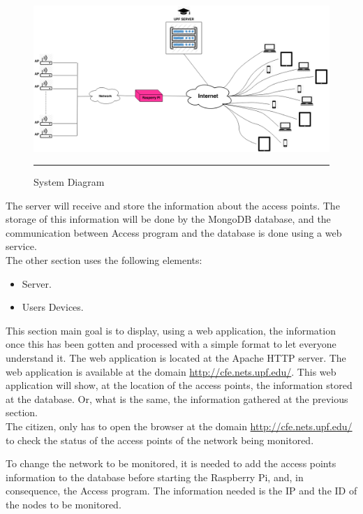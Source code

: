 \documentclass[12pt, a4paper,twoside]{tesi_upf}
\begin{document}
        \begin{figure}[htbp]
          \centering
              \includegraphics[scale=0.42,angle=90]{./figures/arq.png}
              \rule{32em}{0.5pt}
            \caption[System Diagram]{System Diagram}
            \label{fig:arq}
        \end{figure}
        
        The server will receive and store the information about the access points. The storage of this information will be done by the MongoDB database, and the communication between Access program and the database is done using a web service.\\
        
        The other section uses the following elements:
          \begin{itemize}
            \item Server.
            \item Users Devices.
        \end{itemize}
        
        This section main goal is to display, using a web application, the information once this has been gotten and processed with a simple format to let everyone understand it. The web application is located at the Apache HTTP server. The web application is available at the domain \url{http://cfe.nets.upf.edu/}. This web application will show, at the location of the access points, the information stored at the database. Or, what is the same, the information gathered at the previous section.\\
        
        The citizen, only has to open the browser at the domain \url{http://cfe.nets.upf.edu/} to check the status of the access points of the network being monitored.
        
        To change the network to be monitored, it is needed to add the  access points information to the database before starting the Raspberry Pi, and, in consequence, the Access program. The information needed is the IP and the ID of the nodes to be monitored.
        
\end{document}
